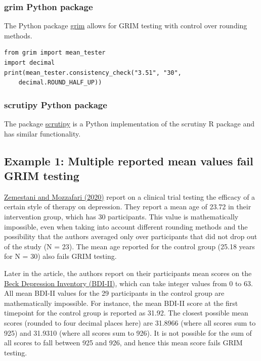 \documentclass[letterpaper, 12pt]{article}
\begin{document}

\subsubsection*{{grim} Python package}

The Python package \href{https://pypi.org/project/grim/}{grim} allows for GRIM testing with control over rounding methods.
\begin{verbatim}
from grim import mean_tester
import decimal
print(mean_tester.consistency_check("3.51", "30", 
    decimal.ROUND_HALF_UP))
\end{verbatim}

\subsubsection*{scrutipy Python package}

The package \href{https://pypi.org/project/scrutipy/}{scrutipy} is a Python implementation of the scrutiny R package and has similar functionality.

\subsection*{Example 1: Multiple reported mean values fail GRIM testing}

\href{https://doi.org/10.1177/0269215520923135}{Zemestani and Mozzafari (2020)} report on a clinical trial testing the efficacy of a certain style of therapy on depression. They report a mean age of 23.72 in their intervention group, which has 30 participants. This value is mathematically impossible, even when taking into account different rounding methods and the possibility that the authors averaged only over participants that did not drop out of the study (N = 23). The mean age reported for the control group (25.18 years for N = 30) also fails GRIM testing.

Later in the article, the authors report on their participants mean scores on the \href{https://en.wikipedia.org/wiki/Beck_Depression_Inventory}{Beck Depression Inventory (BDI-II)}, which can take integer values from 0 to 63. All mean BDI-II values for the 29 participants in the control group are mathematically impossible. For instance, the mean BDI-II score at the first timepoint for the control group is reported as 31.92. The closest possible mean scores (rounded to four decimal places here) are 31.8966 (where all scores sum to 925) and 31.9310 (where all scores sum to 926). It is not possible for the sum of all scores to fall between 925 and 926, and hence this mean score fails GRIM testing.
\end{document}
